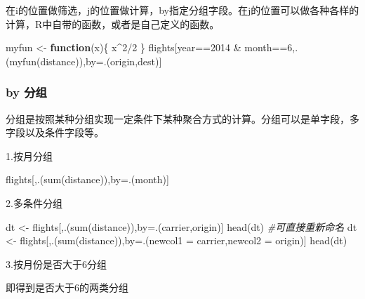 \documentclass[
]{book}
\newenvironment{Shaded}{\begin{snugshade}}{\end{snugshade}}
\newcommand{\AttributeTok}[1]{\textcolor[rgb]{0.77,0.63,0.00}{#1}}
\newcommand{\CommentTok}[1]{\textcolor[rgb]{0.56,0.35,0.01}{\textit{#1}}}
\newcommand{\ControlFlowTok}[1]{\textcolor[rgb]{0.13,0.29,0.53}{\textbf{#1}}}
\newcommand{\DecValTok}[1]{\textcolor[rgb]{0.00,0.00,0.81}{#1}}
\newcommand{\FunctionTok}[1]{\textcolor[rgb]{0.00,0.00,0.00}{#1}}
\newcommand{\NormalTok}[1]{#1}
\newcommand{\OtherTok}[1]{\textcolor[rgb]{0.56,0.35,0.01}{#1}}
\newcommand{\SpecialCharTok}[1]{\textcolor[rgb]{0.00,0.00,0.00}{#1}}
\begin{document}
在i的位置做筛选，j的位置做计算，by指定分组字段。在j的位置可以做各种各样的计算，R中自带的函数，或者是自己定义的函数。

\begin{Shaded}
\begin{Highlighting}[]
\NormalTok{myfun }\OtherTok{\textless{}{-}} \ControlFlowTok{function}\NormalTok{(x)\{}
\NormalTok{    x}\SpecialCharTok{\^{}}\DecValTok{2}\SpecialCharTok{/}\DecValTok{2}
\NormalTok{\}}
\NormalTok{flights[year}\SpecialCharTok{==}\DecValTok{2014} \SpecialCharTok{\&}\NormalTok{ month}\SpecialCharTok{==}\DecValTok{6}\NormalTok{,.(}\FunctionTok{myfun}\NormalTok{(distance)),by}\OtherTok{=}\NormalTok{.(origin,dest)]}
\end{Highlighting}
\end{Shaded}

\hypertarget{by-ux5206ux7ec4}{%
\subsubsection{by 分组}\label{by-ux5206ux7ec4}}

分组是按照某种分组实现一定条件下某种聚合方式的计算。分组可以是单字段，多字段以及条件字段等。

1.按月分组

\begin{Shaded}
\begin{Highlighting}[]
\NormalTok{flights[,.(}\FunctionTok{sum}\NormalTok{(distance)),by}\OtherTok{=}\NormalTok{.(month)]}
\end{Highlighting}
\end{Shaded}

2.多条件分组

\begin{Shaded}
\begin{Highlighting}[]
\NormalTok{dt }\OtherTok{\textless{}{-}}\NormalTok{ flights[,.(}\FunctionTok{sum}\NormalTok{(distance)),by}\OtherTok{=}\NormalTok{.(carrier,origin)]}
\FunctionTok{head}\NormalTok{(dt)}
\CommentTok{\#可直接重新命名}
\NormalTok{dt }\OtherTok{\textless{}{-}}\NormalTok{ flights[,.(}\FunctionTok{sum}\NormalTok{(distance)),by}\OtherTok{=}\NormalTok{.(}\AttributeTok{newcol1 =}\NormalTok{ carrier,}\AttributeTok{newcol2 =}\NormalTok{ origin)]}
\FunctionTok{head}\NormalTok{(dt)}
\end{Highlighting}
\end{Shaded}

3.按月份是否大于6分组

即得到是否大于6的两类分组
\end{document}
